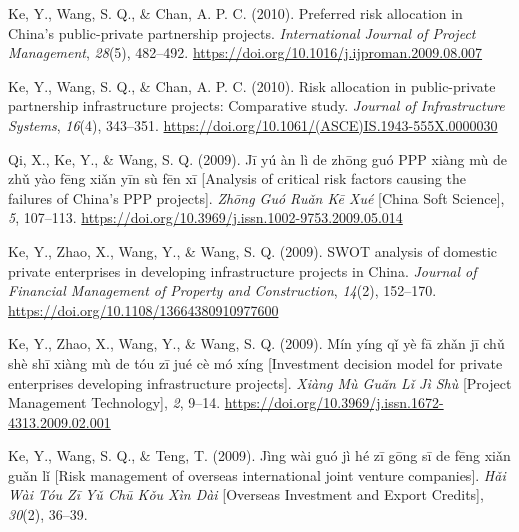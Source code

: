 \documentclass[11pt,a4paper]{report} %
\begin{document}
\begin{tablist}
        \item[2010] \tab{}Ke, Y., Wang, S. Q., \& Chan, A. P. C. (2010). Preferred risk allocation in China's public-private partnership projects. \textit{International Journal of Project Management}, \textit{28}(5), 482--492. \href{https://doi.org/10.1016/j.ijproman.2009.08.007}{https://doi.org/10.1016/j.ijproman.2009.08.007}
        
        \item[2010] \tab{}Ke, Y., Wang, S. Q., \& Chan, A. P. C. (2010). Risk allocation in public-private partnership infrastructure projects: Comparative study. \textit{Journal of Infrastructure Systems}, \textit{16}(4), 343--351. \href{https://doi.org/10.1061/(ASCE)IS.1943-555X.0000030}{https://doi.org/10.1061/(ASCE)IS.1943-555X.0000030}
        
        \item[2009] \tab{}Qi, X., Ke, Y., \& Wang, S. Q. (2009). Jī yú àn lì de zhōng guó PPP xiàng mù de zhǔ yào fēng xiǎn yīn sù fēn xī [Analysis of critical risk factors causing the failures of China’s PPP projects]. \textit{Zhōng Guó Ruǎn Kē Xué} [China Soft Science], \textit{5}, 107--113. \href{https://doi.org/10.3969/j.issn.1002-9753.2009.05.014}{https://doi.org/10.3969/j.issn.1002-9753.2009.05.014}
        
        \item[2009] \tab{}Ke, Y., Zhao, X., Wang, Y., \& Wang, S. Q. (2009). SWOT analysis of domestic private enterprises in developing infrastructure projects in China. \textit{Journal of Financial Management of Property and Construction}, \textit{14}(2), 152--170. \href{https://doi.org/10.1108/13664380910977600}{https://doi.org/10.1108/13664380910977600}
        
        \item[2009] \tab{}Ke, Y., Zhao, X., Wang, Y., \& Wang, S. Q. (2009). Mín yíng qǐ yè fā zhǎn jī chǔ shè shī xiàng mù de tóu zī jué cè mó xíng [Investment decision model for private enterprises developing infrastructure projects]. \textit{Xiàng Mù Guǎn Lǐ Jì Shù} [Project Management Technology], \textit{2}, 9--14. \href{https://doi.org/10.3969/j.issn.1672-4313.2009.02.001}{https://doi.org/10.3969/j.issn.1672-4313.2009.02.001}
        
        \item[2009] \tab{}Ke, Y., Wang, S. Q., \& Teng, T. (2009). Jìng wài guó jì hé zī gōng sī de fēng xiǎn guǎn lǐ [Risk management of overseas international joint venture companies]. \textit{Hǎi Wài Tóu Zī Yǔ Chū Kǒu Xìn Dài} [Overseas Investment and Export Credits], \textit{30}(2), 36--39.
        

\end{tablist}
\end{document}
